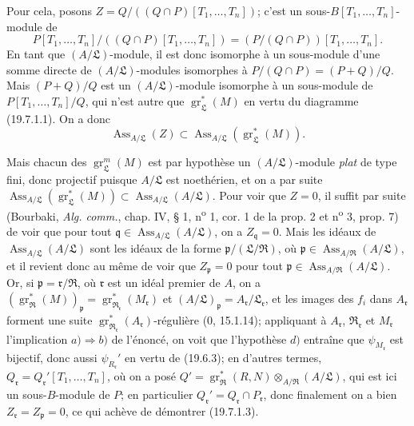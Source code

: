 Pour cela, posons $Z=Q/((Q\cap P)[T_1,\ldots,T_n])$; c'est un sous-$B[T_1,\ldots,T_n]$-module de
\[
  P[T_1,\ldots,T_n]/((Q\cap P)[T_1,\ldots,T_n])=(P/(Q\cap P))[T_1,\ldots,T_n].
\]
En tant que $(A/\mathfrak L)$-module, il est donc isomorphe à un sous-module d'une somme directe de $(A/\mathfrak L)$-modules isomorphes à $P/(Q\cap P)=(P+Q)/Q$. Mais $(P+Q)/Q$ est un $(A/\mathfrak L)$-module isomorphe à un sous-module de $P[T_1,\ldots,T_n]/Q$, qui n'est autre que $\operatorname{gr}_{\mathfrak L}^*(M)$ en vertu du diagramme (19.7.1.1). On a donc
\begin{equation}
  \operatorname{Ass}_{A/\mathfrak L}(Z)\subset\operatorname{Ass}_{A/\mathfrak L}(\operatorname{gr}_{\mathfrak L}^*(M)).
  \tag{19.7.1.4}\label{IV.19.7.1.4}
\end{equation}

Mais chacun des $\operatorname{gr}_{\mathfrak L}^m(M)$ est par hypothèse un $(A/\mathfrak L)$-module \emph{plat} de type fini, donc projectif puisque $A/\mathfrak L$ est noethérien, et on a par suite $\operatorname{Ass}_{A/\mathfrak L}(\operatorname{gr}_{\mathfrak L}^*(M))\subset\operatorname{Ass}_{A/\mathfrak L}(A/\mathfrak L)$. Pour voir que $Z=0$, il suffit par suite (Bourbaki, \emph{Alg. comm.}, chap. IV, § 1, n\textsuperscript{o} 1, cor. 1 de la prop. 2 et n\textsuperscript{o} 3, prop. 7) de voir que pour tout $\mathfrak q\in\operatorname{Ass}_{A/\mathfrak L}(A/\mathfrak L)$, on a $Z_{\mathfrak q}=0$. Mais les idéaux de $\operatorname{Ass}_{A/\mathfrak L}(A/\mathfrak L)$ sont les idéaux de la forme $\mathfrak p/(\mathfrak L/\mathfrak R)$, où $\mathfrak p\in\operatorname{Ass}_{A/\mathfrak R}(A/\mathfrak L)$, et il revient donc au même de voir que $Z_{\mathfrak p}=0$ pour tout $\mathfrak p\in\operatorname{Ass}_{A/\mathfrak R}(A/\mathfrak L)$. Or, si $\mathfrak p=\mathfrak r/\mathfrak R$, où $\mathfrak r$ est un idéal premier de $A$, on a $(\operatorname{gr}_{\mathfrak R}^*(M))_{\mathfrak p}=\operatorname{gr}_{\mathfrak R_{\mathfrak r}}^*(M_{\mathfrak r})$ et $(A/\mathfrak L)_{\mathfrak p}=A_{\mathfrak r}/\mathfrak L_{\mathfrak r}$, et les images des $f_i$ dans $A_{\mathfrak r}$ forment une suite $\operatorname{gr}_{\mathfrak R_{\mathfrak r}}^*(A_{\mathfrak r})$-régulière ($0$, 15.1.14); appliquant à $A_{\mathfrak r}$, $\mathfrak R_{\mathfrak r}$ et $M_{\mathfrak r}$ l'implication $a)\Rightarrow b)$ de l'énoncé, on voit que l'hypothèse $d)$ entraîne que $\psi_{M_{\mathfrak r}}$ est bijectif, donc aussi $\psi_{R_{\mathfrak r}}'$ en vertu de (19.6.3); en d'autres termes, $Q_{\mathfrak r}=Q_{\mathfrak r}'[T_1,\ldots,T_n]$, où on a posé $Q'=\operatorname{gr}_{\mathfrak R}^*(R,N)\otimes_{A/\mathfrak R}(A/\mathfrak L)$, qui est ici un sous-$B$-module de $P$; en particulier $Q_{\mathfrak r}'=Q_{\mathfrak r}\cap P_{\mathfrak r}$, donc finalement on a bien $Z_{\mathfrak r}=Z_{\mathfrak p}=0$, ce qui achève de démontrer (19.7.1.3).

